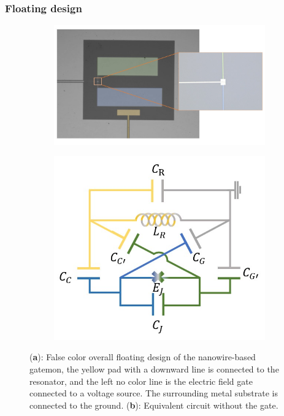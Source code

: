 \subsubsection{Floating design}
\begin{figure}[h!]
    \centering
    \begin{subfigure}[b]{0.8\textwidth}
         \centering
         \includegraphics[width=\textwidth]{Pic/FalsecolorDesign.jpg}
         \caption{}
         \label{floatingtransmon_real}
     \end{subfigure}
     \hfill
     \begin{subfigure}[b]{0.5\textwidth}
         \centering
         \includegraphics[width=\textwidth]{Pic/Floating transmon circuit.jpg}
         \caption{}
         \label{floatingtransmon_circuit}
     \end{subfigure}
    \caption{(\textbf{a}): False color overall floating design of the nanowire-based gatemon, the yellow pad with a downward line is connected to the resonator, and the left no color line is the electric field gate connected to a voltage source. The surrounding metal substrate is connected to the ground. (\textbf{b}): Equivalent circuit without the gate.}
    \label{floatingtransmon}
\end{figure}
